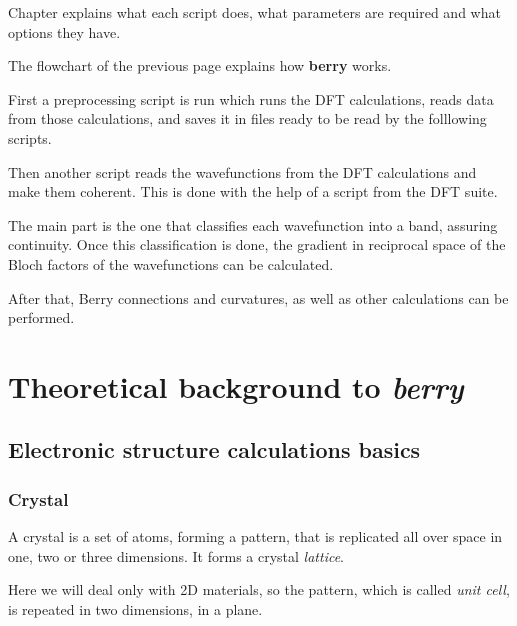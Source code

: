 \documentclass[a4paper,12pt]{report}
\begin{document}
Chapter  explains what each script does,
what parameters are required and what options they have.


The flowchart of the previous page explains how \textbf{berry} works.

First a preprocessing script is run which runs the DFT calculations, reads data from those
calculations, and saves it in files ready to be read by the folllowing scripts.

Then another script reads the wavefunctions from the DFT calculations and make them coherent.
This is done with the help of a script from the DFT suite.

The main part is the one that classifies each wavefunction into a band, assuring continuity.
Once this classification is done, the gradient in reciprocal space of the Bloch factors
of the wavefunctions can be calculated.

After that, Berry connections and curvatures, as well as other calculations can be performed.
















\chapter{Theoretical background to \emph{berry}}

\section{Electronic structure calculations basics}

\subsection*{Crystal}
A crystal is a set of atoms, forming a pattern, that is replicated all over space in one, two or three dimensions.
It forms a crystal \emph{lattice}.

Here we will deal only with 2D materials, so the pattern, which is called \emph{unit cell},
is repeated in two dimensions, in a plane.
\end{document}
